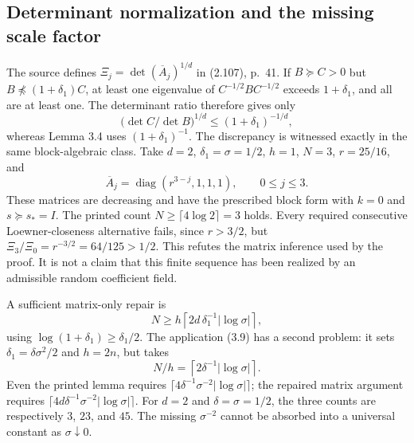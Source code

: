 \documentclass[10pt]{article}
\begin{document}
\subsection*{Determinant normalization and the missing scale factor}
The source defines \(\Xi_j=\det(\overline A_j)^{1/d}\) in (2.107), p. 41. If \(B\succeq C>0\) but \(B\npreceq(1+\delta_1)C\), at least one eigenvalue of \(C^{-1/2}BC^{-1/2}\) exceeds \(1+\delta_1\), and all are at least one. The determinant ratio therefore gives only \[\bigl(\det C/\det B\bigr)^{1/d}
 \le(1+\delta_1)^{-1/d},\] whereas Lemma 3.4 uses \((1+\delta_1)^{-1}\). The discrepancy is witnessed exactly in the same block-algebraic class. Take \(d=2\), \(\delta_1=\sigma=1/2\), \(h=1\), \(N=3\), \(r=25/16\), and \[\overline A_j=\operatorname{diag}(r^{3-j},1,1,1),\qquad 0\le j\le3.\] These matrices are decreasing and have the prescribed block form with \(k=0\) and \(s\succeq s_*=I\). The printed count \(N\ge\lceil4\log2\rceil=3\) holds. Every required consecutive Loewner-closeness alternative fails, since \(r>3/2\), but \(\Xi_3/\Xi_0=r^{-3/2}=64/125>1/2\). This refutes the matrix inference used by the proof. It is not a claim that this finite sequence has been realized by an admissible random coefficient field.\par
A sufficient matrix-only repair is \[N\ge h\left\lceil2d\,\delta_1^{-1}|\log\sigma|\right\rceil,\] using \(\log(1+\delta_1)\ge\delta_1/2\). The application (3.9) has a second problem: it sets \(\delta_1=\delta\sigma^2/2\) and \(h=2n\), but takes \[N/h=\left\lceil2\delta^{-1}|\log\sigma|\right\rceil.\] Even the printed lemma requires \(\lceil4\delta^{-1}\sigma^{-2}|\log\sigma|\rceil\); the repaired matrix argument requires \(\lceil4d\delta^{-1}\sigma^{-2}|\log\sigma|\rceil\). For \(d=2\) and \(\delta=\sigma=1/2\), the three counts are respectively \(3\), \(23\), and \(45\). The missing \(\sigma^{-2}\) cannot be absorbed into a universal constant as \(\sigma\downarrow0\).\par
\end{document}
